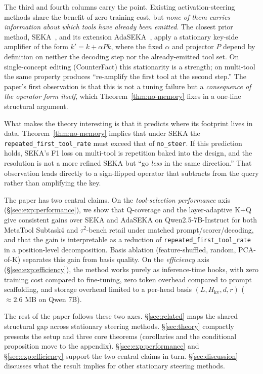 The third and fourth columns carry the point. Existing activation-steering methods share the benefit of zero training cost, but \emph{none of them carries information about which tools have already been emitted}. The closest prior method, SEKA~\citep{SEKA}, and its extension AdaSEKA~\citep{AdaSEKA}, apply a stationary key-side amplifier of the form $k' = k + \alpha P k$, where the fixed $\alpha$ and projector $P$ depend by definition on neither the decoding step nor the already-emitted tool set. On single-concept editing (CounterFact) this stationarity is a strength; on multi-tool the same property produces ``re-amplify the first tool at the second step.'' The paper's first observation is that this is not a tuning failure but a \emph{consequence of the operator form itself}, which Theorem~\ref{thm:no-memory} fixes in a one-line structural argument.

What makes the theory interesting is that it predicts where its footprint lives in data. Theorem~\ref{thm:no-memory} implies that under SEKA the \texttt{repeated\_first\_tool\_rate} must exceed that of \texttt{no\_steer}. If this prediction holds, SEKA's F1 loss on multi-tool is repetition baked into the design, and the resolution is not a more refined SEKA but ``go \emph{less} in the same direction.'' That observation leads directly to a sign-flipped operator that subtracts from the query rather than amplifying the key.

The paper has two central claims. On the \emph{tool-selection performance} axis (\S\ref{sec:exp:performance}), we show that Q-coverage and the layer-adaptive K+Q give consistent gains over SEKA and AdaSEKA on Qwen2.5-7B-Instruct for both MetaTool Subtask4 and $\tau^2$-bench retail under matched prompt/scorer/decoding, and that the gain is interpretable as a reduction of \texttt{repeated\_first\_tool\_rate} in a position-level decomposition. Basis ablation (feature-shuffled, random, PCA-of-K) separates this gain from basis quality. On the \emph{efficiency} axis (\S\ref{sec:exp:efficiency}), the method works purely as inference-time hooks, with zero training cost compared to fine-tuning, zero token overhead compared to prompt scaffolding, and storage overhead limited to a per-head basis $(L, H_{\mathrm{kv}}, d, r)$ ($\approx 2.6$ MB on Qwen 7B).

The rest of the paper follows these two axes. \S\ref{sec:related} maps the shared structural gap across stationary steering methods. \S\ref{sec:theory} compactly presents the setup and three core theorems (corollaries and the conditional proposition move to the appendix). \S\ref{sec:exp:performance} and \S\ref{sec:exp:efficiency} support the two central claims in turn. \S\ref{sec:discussion} discusses what the result implies for other stationary steering methods.
